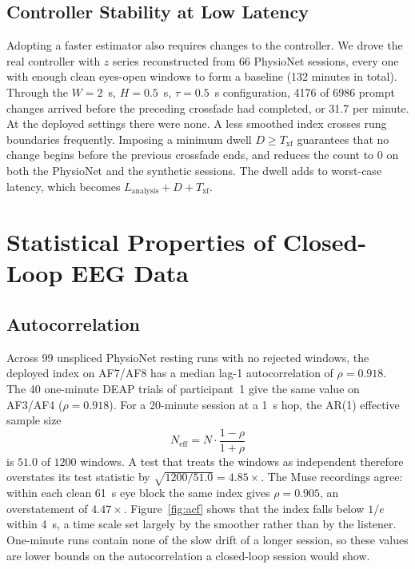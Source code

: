 \documentclass[11pt,a4paper]{article}
\begin{document}
\subsection{Controller Stability at Low Latency}

Adopting a faster estimator also requires changes to the controller. We drove the real
controller with $z$ series reconstructed from 66 PhysioNet sessions, every one with enough
clean eyes-open windows to form a baseline (132 minutes in total). Through the
$W = 2$~s, $H = 0.5$~s, $\tau = 0.5$~s configuration, 4176 of 6986 prompt changes arrived
before the preceding crossfade had completed, or 31.7 per minute. At the deployed settings
there were none. A less smoothed index crosses rung boundaries frequently. Imposing a
minimum dwell $D \ge T_{\mathrm{xf}}$ guarantees that no change begins before the previous
crossfade ends, and reduces the count to 0 on both the PhysioNet and the synthetic
sessions. The dwell adds to worst-case latency, which becomes
$L_{\mathrm{analysis}} + D + T_{\mathrm{xf}}$.

\section{Statistical Properties of Closed-Loop EEG Data}
\label{sec:stats}

\subsection{Autocorrelation}

Across 99 unspliced PhysioNet resting runs with no rejected windows, the deployed index on
AF7/AF8 has a median lag-1 autocorrelation of $\rho = 0.918$. The 40 one-minute DEAP trials
of participant~1 give the same value on AF3/AF4 ($\rho = 0.918$). For a 20-minute session
at a 1~s hop, the AR(1) effective sample size
\begin{equation}
  N_{\mathrm{eff}} = N\cdot\frac{1-\rho}{1+\rho}
  \label{eq:neff}
\end{equation}
is $51.0$ of $1200$ windows. A test that treats the windows as independent therefore
overstates its test statistic by $\sqrt{1200/51.0} = 4.85\times$. The Muse recordings agree:
within each clean 61~s eye block the same index gives $\rho = 0.905$, an overstatement of
$4.47\times$. Figure~\ref{fig:acf}
shows that the index falls below $1/e$ within 4~s, a time scale set largely by the
smoother rather than by the listener. One-minute runs contain none of the slow drift of a
longer session, so these values are lower bounds on the autocorrelation a closed-loop
session would show.
\end{document}
